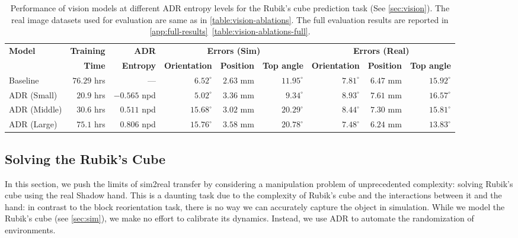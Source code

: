\begin{table}[h]
    \caption{Performance of vision models at different ADR entropy levels for the Rubik's cube prediction task (See \autoref{sec:vision}). The real image datasets used for evaluation are same as in \autoref{table:vision-ablations}. The full evaluation results are reported in \autoref{app:full-results}~\autoref{table:vision-ablations-full}.}
    \centering
    \renewcommand{\arraystretch}{1.3}
        \begin{tabular}{@{}lrr|rrr|rrr@{}}
            \toprule
            \multirow{2}{*}{\textbf{Model}} & \textbf{Training} & \textbf{ADR} & \multicolumn{3}{c}{\textbf{Errors (Sim)}} & \multicolumn{3}{c}{\textbf{Errors (Real)}} \\
            & \textbf{Time} & \textbf{Entropy} 
            & \textbf{Orientation} & \textbf{Position} & \textbf{Top angle} 
            & \textbf{Orientation} & \textbf{Position} & \textbf{Top angle} \\
            \midrule
            Baseline 
            & $76.29$ hrs & --- & $6.52^\circ$ & $2.63$ mm & $11.95^\circ$ 
            & $7.81^\circ$ & $6.47$ mm & $15.92^\circ$ \\
            \midrule
            ADR (Small) 
            & $20.9$ hrs & $-0.565$ npd & $5.02^\circ$ & $3.36$ mm & $9.34^\circ$ 
            & $8.93^\circ$ & $7.61$ mm & $16.57^\circ$ \\
            ADR (Middle) 
            & $30.6$ hrs & $0.511$ npd & $15.68^\circ$ & $3.02$ mm & $20.29^\circ$ 
            & $8.44^\circ$ & $7.30$ mm & $15.81^\circ$\\
            ADR (Large) 
            & $75.1$ hrs & $\mathbf{0.806}$ npd & $15.76^\circ$ & $3.58$ mm & $20.78^\circ$ 
            & $\mathbf{7.48}^\circ$ & $\mathbf{6.24}$ mm & $\mathbf{13.83}^\circ$ \\
            \bottomrule
        \end{tabular}
    \label{table:vision_adr_full}
\end{table}

\subsection{Solving the Rubik's Cube}
\label{sec:result-rubik}

In this section, we push the limits of sim2real transfer by considering a manipulation problem of unprecedented complexity: solving Rubik's cube using the real Shadow hand. This is a daunting task due to the complexity of Rubik's cube and the interactions between it and the hand: in contrast to the block reorientation task, there is no way we can accurately capture the object in simulation. While we model the Rubik's cube (see \autoref{sec:sim}), we make no effort to calibrate its dynamics. Instead, we use ADR to automate the randomization of environments.

